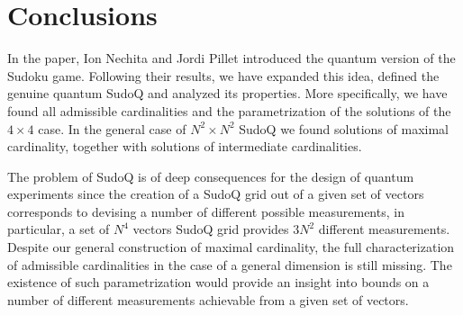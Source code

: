 \documentclass[aps,onecolumn,floatfix,superscriptaddress]{revtex4}
\begin{document}
\section{Conclusions}
In the paper, \cite{Nechita2020SudoQA} Ion Nechita and Jordi Pillet introduced the quantum version of the Sudoku game. Following their results, we have expanded this idea, defined the genuine quantum SudoQ and analyzed its properties. More specifically, we have found all admissible cardinalities and the parametrization of the solutions of the $4\times 4$ case.
In the general case of $N^2 \times N^2$ SudoQ we found solutions of maximal cardinality, together with solutions of intermediate cardinalities.

The problem of SudoQ is of deep consequences for the design of quantum experiments since the creation of a SudoQ grid out of a given set of vectors corresponds to devising a number of different possible measurements, in particular, a set of $N^4$ vectors SudoQ grid provides $3N^2$ different measurements.
Despite our general construction of maximal cardinality, the full characterization of admissible cardinalities in the case of a general dimension is still missing. 
The existence of such parametrization would provide an insight into bounds on a number of different measurements achievable from a given set of vectors.



\printbibliography
\end{document}
